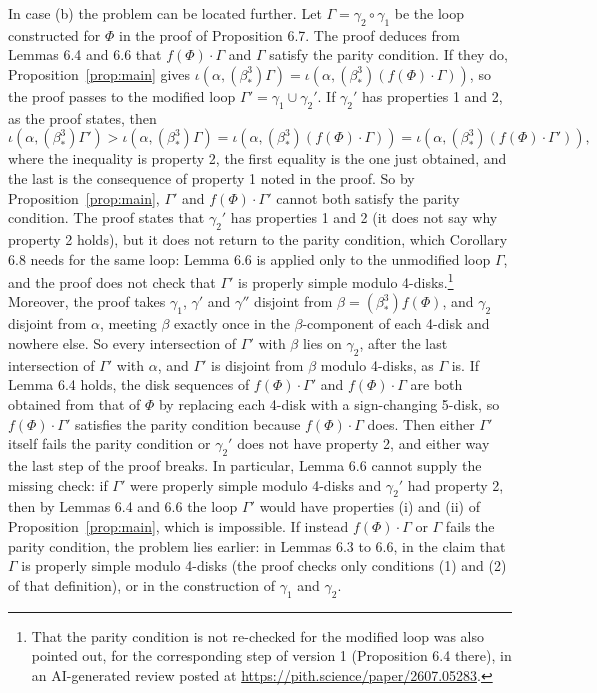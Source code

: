 \documentclass[11pt]{amsart}
\theoremstyle{remark}
\newcommand{\bs}{\beta^3_*}
\begin{document}
In case (b) the problem can be located further. Let $\Gamma=\gamma_2\circ\gamma_1$ be the loop constructed for $\Phi$ in the proof of Proposition 6.7. The proof deduces from Lemmas 6.4 and 6.6 that $f(\Phi)\cdot\Gamma$ and $\Gamma$ satisfy the parity condition. If they do, Proposition~\ref{prop:main} gives $\iota(\alpha,(\bs)\Gamma)=\iota(\alpha,(\bs)(f(\Phi)\cdot\Gamma))$, so the proof passes to the modified loop $\Gamma'=\gamma_1\cup\gamma_2'$. If $\gamma_2'$ has properties 1 and 2, as the proof states, then
\[
\iota(\alpha,(\bs)\Gamma')>\iota(\alpha,(\bs)\Gamma)=\iota(\alpha,(\bs)(f(\Phi)\cdot\Gamma))=\iota(\alpha,(\bs)(f(\Phi)\cdot\Gamma')),
\]
where the inequality is property 2, the first equality is the one just obtained, and the last is the consequence of property 1 noted in the proof. So by Proposition~\ref{prop:main}, $\Gamma'$ and $f(\Phi)\cdot\Gamma'$ cannot both satisfy the parity condition. The proof states that $\gamma_2'$ has properties 1 and 2 (it does not say why property 2 holds), but it does not return to the parity condition, which Corollary 6.8 needs for the same loop: Lemma 6.6 is applied only to the unmodified loop $\Gamma$, and the proof does not check that $\Gamma'$ is properly simple modulo 4-disks.\footnote{That the parity condition is not re-checked for the modified loop was also pointed out, for the corresponding step of version 1 (Proposition 6.4 there), in an AI-generated review posted at \url{https://pith.science/paper/2607.05283}.} Moreover, the proof takes $\gamma_1$, $\gamma'$ and $\gamma''$ disjoint from $\beta=(\bs)f(\Phi)$, and $\gamma_2$ disjoint from $\alpha$, meeting $\beta$ exactly once in the $\beta$-component of each 4-disk and nowhere else. So every intersection of $\Gamma'$ with $\beta$ lies on $\gamma_2$, after the last intersection of $\Gamma'$ with $\alpha$, and $\Gamma'$ is disjoint from $\beta$ modulo 4-disks, as $\Gamma$ is. If Lemma 6.4 holds, the disk sequences of $f(\Phi)\cdot\Gamma'$ and $f(\Phi)\cdot\Gamma$ are both obtained from that of $\Phi$ by replacing each 4-disk with a sign-changing 5-disk, so $f(\Phi)\cdot\Gamma'$ satisfies the parity condition because $f(\Phi)\cdot\Gamma$ does. Then either $\Gamma'$ itself fails the parity condition or $\gamma_2'$ does not have property 2, and either way the last step of the proof breaks. In particular, Lemma 6.6 cannot supply the missing check: if $\Gamma'$ were properly simple modulo 4-disks and $\gamma_2'$ had property 2, then by Lemmas 6.4 and 6.6 the loop $\Gamma'$ would have properties (i) and (ii) of Proposition~\ref{prop:main}, which is impossible. If instead $f(\Phi)\cdot\Gamma$ or $\Gamma$ fails the parity condition, the problem lies earlier: in Lemmas 6.3 to 6.6, in the claim that $\Gamma$ is properly simple modulo 4-disks (the proof checks only conditions (1) and (2) of that definition), or in the construction of $\gamma_1$ and $\gamma_2$.
\end{document}
